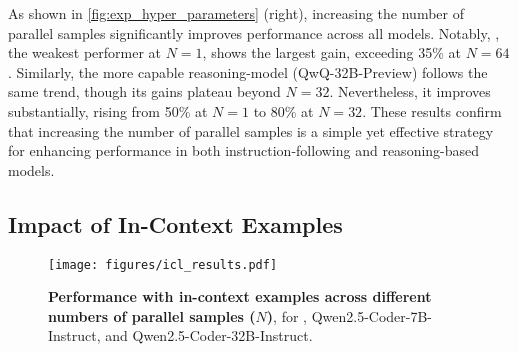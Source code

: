 As shown in \cref{fig:exp_hyper_parameters} (right), increasing the number of parallel samples significantly improves performance across all models. Notably, \qwensevenb, the weakest performer at \( N=1 \), shows the largest gain, exceeding 35\% at \( N=64 \). Similarly, the more capable reasoning-model (QwQ-32B-Preview) follows the same trend, though its gains plateau beyond \( N=32 \). Nevertheless, it improves substantially, rising from 50\% at \( N=1 \) to 80\% at \( N=32 \). These results confirm that increasing the number of parallel samples is a simple yet effective strategy for enhancing performance in both instruction-following and reasoning-based models.

\subsection{Impact of In-Context Examples} 
\label{sec:ablation_ICL}

\begin{figure}[h]
    \centering
    \texttt{[image: figures/icl\_results.pdf]}
    \caption{\textbf{Performance with in-context examples across different numbers of parallel samples (\(N\))}, for \fouromini, Qwen2.5-Coder-7B-Instruct, and Qwen2.5-Coder-32B-Instruct.}
    \label{fig:icl_performance}
\end{figure}

